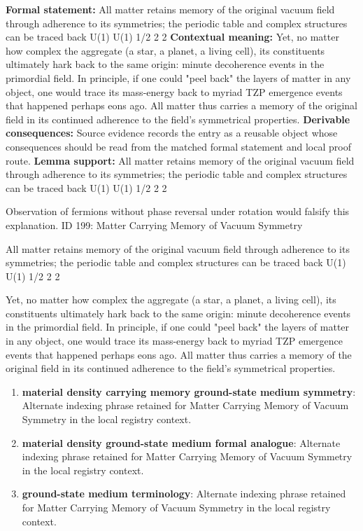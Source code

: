 \begingroup\footnotesize\setlength{\emergencystretch}{3em}\sloppy
\textbf{Formal statement:} All matter retains memory of the original vacuum field through adherence to its symmetries; the periodic table and complex structures can be traced back U(1) U(1) 1/2 2  2 
\textbf{Contextual meaning:} Yet, no matter how complex the aggregate (a star, a planet, a living cell), its constituents ultimately hark back to the same origin: minute decoherence events in the primordial field. In principle, if one could "peel back" the layers of matter in any object, one would trace its mass-energy back to myriad TZP emergence events that happened perhaps eons ago. All matter thus carries a memory of the original field in its continued adherence to the field's symmetrical properties.
\textbf{Derivable consequences:} Source evidence records the entry as a reusable object whose consequences should be read from the matched formal statement and local proof route.
\textbf{Lemma support:} All matter retains memory of the original vacuum field through adherence to its symmetries; the periodic table and complex structures can be traced back U(1) U(1) 1/2 2  2 \par
\endgroup

Observation of fermions without phase reversal under rotation would falsify this explanation. ID 199: Matter Carrying Memory of Vacuum Symmetry  

All matter retains memory of the original vacuum field through adherence to its symmetries; the periodic table and complex structures can be traced back U(1) U(1) 1/2 2  2 

Yet, no matter how complex the aggregate (a star, a planet, a living cell), its constituents ultimately hark back to the same origin: minute decoherence events in the primordial field. In principle, if one could "peel back" the layers of matter in any object, one would trace its mass-energy back to myriad TZP emergence events that happened perhaps eons ago. All matter thus carries a memory of the original field in its continued adherence to the field's symmetrical properties.
\endgroup

\begin{enumerate}[leftmargin=1.6em,itemsep=6pt,topsep=4pt]
\item \textbf{material density carrying memory ground-state medium symmetry}: Alternate indexing phrase retained for Matter Carrying Memory of Vacuum Symmetry in the local registry context.
\item \textbf{material density ground-state medium formal analogue}: Alternate indexing phrase retained for Matter Carrying Memory of Vacuum Symmetry in the local registry context.
\item \textbf{ground-state medium terminology}: Alternate indexing phrase retained for Matter Carrying Memory of Vacuum Symmetry in the local registry context.
\end{enumerate}

